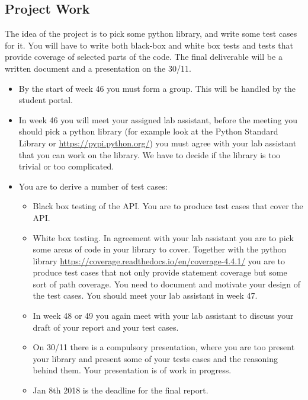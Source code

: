 \documentclass[a4page]{article}
\begin{document}
\subsection{Project Work}

The idea of the project is to pick some python library, and write some
test cases for it. You will have to write both black-box and white box
tests and tests that provide coverage of selected parts of the
code. The final deliverable will be a written document and a
presentation on the 30/11. 
  \begin{itemize}
  \item By  the start of  week  46 you must form a group. This will be
    handled by the student portal.
  \item In week 46 you will meet your assigned lab assistant, before the
    meeting you should pick a python library (for example look at the Python
    Standard Library or \url{https://pypi.python.org/}) you must agree
    with your lab assistant that you can work on the library. We have
    to decide if the library is too trivial or too complicated.
  \item You are to derive a number of test cases:
    \begin{itemize}
    \item  Black box testing of the API. You are to produce test cases
      that cover the API.
    \item  White box testing. In agreement with your lab assistant you
      are to pick some areas of code in your library to cover. Together with
      the python library
      \url{https://coverage.readthedocs.io/en/coverage-4.4.1/} you are
      to produce test cases that not only provide statement coverage
      but some sort of path coverage. You need to document and
      motivate your design of the test cases. You should meet your lab
      assistant in week 47.
    \item In week 48 or 49 you again meet with your lab assistant to
      discuss your draft of your  report and your test cases.
    \item On 30/11 there is a compulsory presentation, where you are
      too present your library and present some of your tests cases
      and the reasoning behind them. Your presentation is of work in
      progress. 
    \item Jan 8th 2018 is  the deadline for the final
      report. 
    \end{itemize}
  \end{itemize}
\end{document}
